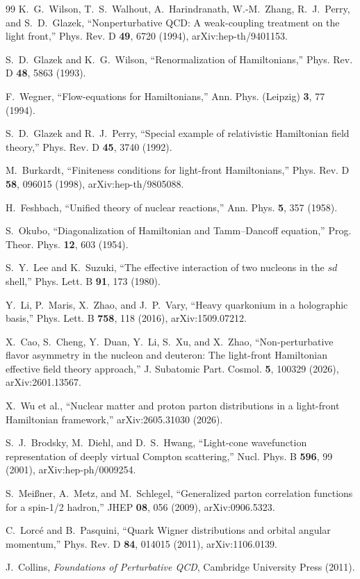 \documentclass[11pt]{article}
\begin{document}
\begin{thebibliography}{99}
K.~G.~Wilson, T.~S.~Walhout, A.~Harindranath, W.-M.~Zhang,
R.~J.~Perry, and S.~D.~Glazek,
``Nonperturbative QCD: A weak-coupling treatment on the light front,''
Phys. Rev. D \textbf{49}, 6720 (1994),
arXiv:hep-th/9401153.

S.~D.~Glazek and K.~G.~Wilson,
``Renormalization of Hamiltonians,''
Phys. Rev. D \textbf{48}, 5863 (1993).

F.~Wegner,
``Flow-equations for Hamiltonians,''
Ann. Phys. (Leipzig) \textbf{3}, 77 (1994).

S.~D.~Glazek and R.~J.~Perry,
``Special example of relativistic Hamiltonian field theory,''
Phys. Rev. D \textbf{45}, 3740 (1992).

M.~Burkardt,
``Finiteness conditions for light-front Hamiltonians,''
Phys. Rev. D \textbf{58}, 096015 (1998),
arXiv:hep-th/9805088.

H.~Feshbach,
``Unified theory of nuclear reactions,''
Ann. Phys. \textbf{5}, 357 (1958).

S.~Okubo,
``Diagonalization of Hamiltonian and Tamm--Dancoff equation,''
Prog. Theor. Phys. \textbf{12}, 603 (1954).

S.~Y.~Lee and K.~Suzuki,
``The effective interaction of two nucleons in the \(sd\) shell,''
Phys. Lett. B \textbf{91}, 173 (1980).

Y.~Li, P.~Maris, X.~Zhao, and J.~P.~Vary,
``Heavy quarkonium in a holographic basis,''
Phys. Lett. B \textbf{758}, 118 (2016),
arXiv:1509.07212.

X.~Cao, S.~Cheng, Y.~Duan, Y.~Li, S.~Xu, and X.~Zhao,
``Non-perturbative flavor asymmetry in the nucleon and deuteron: The
light-front Hamiltonian effective field theory approach,''
J. Subatomic Part. Cosmol. \textbf{5}, 100329 (2026),
arXiv:2601.13567.

X.~Wu et al.,
``Nuclear matter and proton parton distributions in a light-front Hamiltonian
framework,''
arXiv:2605.31030 (2026).

S.~J.~Brodsky, M.~Diehl, and D.~S.~Hwang,
``Light-cone wavefunction representation of deeply virtual Compton scattering,''
Nucl. Phys. B \textbf{596}, 99 (2001),
arXiv:hep-ph/0009254.

S.~Mei{\ss}ner, A.~Metz, and M.~Schlegel,
``Generalized parton correlation functions for a spin-1/2 hadron,''
JHEP \textbf{08}, 056 (2009),
arXiv:0906.5323.

C.~Lorc\'e and B.~Pasquini,
``Quark Wigner distributions and orbital angular momentum,''
Phys. Rev. D \textbf{84}, 014015 (2011),
arXiv:1106.0139.

J.~Collins,
\emph{Foundations of Perturbative QCD},
Cambridge University Press (2011).

\end{thebibliography}
\end{document}
